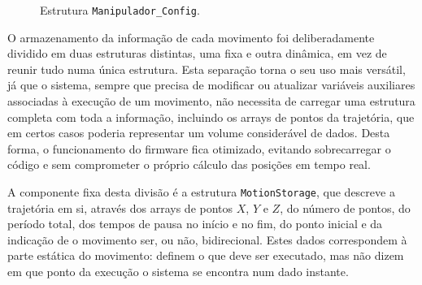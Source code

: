 \begin{figure}[!htbp]
  \centering
  \caption{Estrutura \texttt{Manipulador\_Config}.}
  \label{fig:estrutura-manipulador-config}
\end{figure}

O armazenamento da informação de cada movimento foi deliberadamente dividido em duas estruturas distintas, uma fixa e outra dinâmica, em vez de reunir tudo numa única estrutura. Esta separação torna o seu uso mais versátil, já que o sistema, sempre que precisa de modificar ou atualizar variáveis auxiliares associadas à execução de um movimento, não necessita de carregar uma estrutura completa com toda a informação, incluindo os arrays de pontos da trajetória, que em certos casos poderia representar um volume considerável de dados. Desta forma, o funcionamento do firmware fica otimizado, evitando sobrecarregar o código e sem comprometer o próprio cálculo das posições em tempo real.

A componente fixa desta divisão é a estrutura \texttt{MotionStorage}, que descreve a trajetória em si, através dos arrays de pontos \(X\), \(Y\) e \(Z\), do número de pontos, do período total, dos tempos de pausa no início e no fim, do ponto inicial e da indicação de o movimento ser, ou não, bidirecional. Estes dados correspondem à parte estática do movimento: definem o que deve ser executado, mas não dizem em que ponto da execução o sistema se encontra num dado instante.

